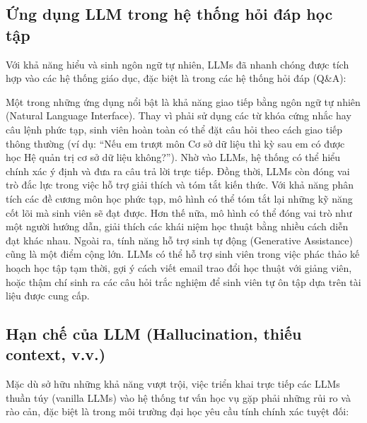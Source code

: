 \subsection{Ứng dụng LLM trong hệ thống hỏi đáp học tập}
Với khả năng hiểu và sinh ngôn ngữ tự nhiên, LLMs đã nhanh chóng được tích hợp vào các hệ thống giáo dục, đặc biệt là trong các hệ thống hỏi đáp (Q\&A):

Một trong những ứng dụng nổi bật là khả năng giao tiếp bằng ngôn ngữ tự nhiên (Natural Language Interface). Thay vì phải sử dụng các từ khóa cứng nhắc hay câu lệnh phức tạp, sinh viên hoàn toàn có thể đặt câu hỏi theo cách giao tiếp thông thường (ví dụ: ``Nếu em trượt môn Cơ sở dữ liệu thì kỳ sau em có được học Hệ quản trị cơ sở dữ liệu không?''). Nhờ vào LLMs, hệ thống có thể hiểu chính xác ý định và đưa ra câu trả lời trực tiếp.
Đồng thời, LLMs còn đóng vai trò đắc lực trong việc hỗ trợ giải thích và tóm tắt kiến thức. Với khả năng phân tích các đề cương môn học phức tạp, mô hình có thể tóm tắt lại những kỹ năng cốt lõi mà sinh viên sẽ đạt được. Hơn thế nữa, mô hình có thể đóng vai trò như một người hướng dẫn, giải thích các khái niệm học thuật bằng nhiều cách diễn đạt khác nhau.
Ngoài ra, tính năng hỗ trợ sinh tự động (Generative Assistance) cũng là một điểm cộng lớn. LLMs có thể hỗ trợ sinh viên trong việc phác thảo kế hoạch học tập tạm thời, gợi ý cách viết email trao đổi học thuật với giảng viên, hoặc thậm chí sinh ra các câu hỏi trắc nghiệm để sinh viên tự ôn tập dựa trên tài liệu được cung cấp.

\subsection{Hạn chế của LLM (Hallucination, thiếu context, v.v.)}
Mặc dù sở hữu những khả năng vượt trội, việc triển khai trực tiếp các LLMs thuần túy (vanilla LLMs) vào hệ thống tư vấn học vụ gặp phải những rủi ro và rào cản, đặc biệt là trong môi trường đại học yêu cầu tính chính xác tuyệt đối:

